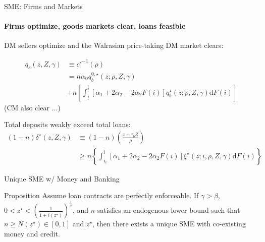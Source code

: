 \documentclass[10pt,english,slidetop,compress,
              blue,mathserif,color=option]{beamer}
\theoremstyle{plain}
\theoremstyle{definition}
\begin{document}
\begin{frame}{SME: Firms and Markets}
\framesubtitle{Firms optimize, goods markets clear, loans feasible}

  DM sellers optimize and the Walrasian price-taking DM market clears:

    \begin{equation}
      \begin{split}
        q_{s} \left(z,Z,\gamma\right)
        & \equiv c'^{-1}(\rho)
        \\
        &=
        n
          \alpha_{0}q_{b}^{0,\star}\left(z;\rho,Z,\gamma\right)
        \\
        &+n %
          \left[\int_{\underline{i}}^{\overline{i}}
            \left[
              \alpha_{1}+2\alpha_{2}
              -2\alpha_{2}F\left(i\right)
            \right]
            q_{b}^{\star}\left(z;\rho,Z,\gamma\right)\text{d}F\left(i\right)
        \right]
      \end{split}
      \label{eq:q clearing}
    \end{equation}
  (CM also clear ...)

  \medskip



  Total deposits weakly exceed total loans:
    \begin{equation}
      \begin{split}
        (1-n)\delta^{\star}\left(z,Z,\gamma\right)
        & \equiv
        (1-n) \left(\frac{z+\tau_{b}Z}{\rho}\right)
        \\
        & \geq
        n %
        \left\{
          \int_{i_{\underline{i}}}^{\overline{i}}
            \left[
              \alpha_{1}+2\alpha_{2}
              - 2\alpha_{2}F\left(i\right)
            \right]
            \xi^{\star}\left(z;i,\rho,Z,\gamma\right)
            \text{d}F\left(i\right)
        \right\}
      \end{split}
      \label{eq:loan feasibility}
    \end{equation}

\end{frame}

\begin{frame}{Unique SME w/ Money and Banking}

  \begin{block}{Proposition}
    Assume loan contracts are perfectly enforceable. If $\gamma>\beta$, $0 < z^{\star} < \left(\frac{1}{1+\overline{i}(z^{\star})}\right)^\frac{1}{\sigma}$, and $n$ satisfies an endogenous lower bound such that $n \geq N(z^{\star}) \in [0,1]$ and $z^{\star}$, then there exists a unique SME with co-existing money and credit. 
  \end{block}

\end{frame}
\end{document}
